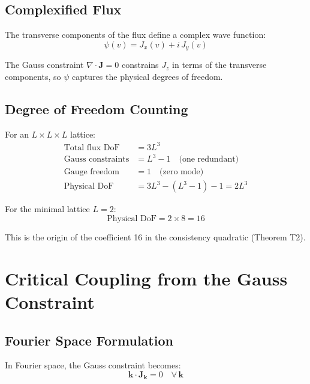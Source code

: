 \documentclass[11pt,a4paper]{article}
\theoremstyle{definition}
\theoremstyle{remark}
\begin{document}
\subsection{Complexified Flux}

The transverse components of the flux define a complex wave function:
\begin{equation}
    \psi(v) = J_x(v) + i\, J_y(v)
\end{equation}

The Gauss constraint $\nabla \cdot \mathbf{J} = 0$ constrains $J_z$ in terms of the transverse components, so $\psi$ captures the physical degrees of freedom.

\subsection{Degree of Freedom Counting}

For an $L \times L \times L$ lattice:
\begin{align}
    \text{Total flux DoF} &= 3L^3 \\
    \text{Gauss constraints} &= L^3 - 1 \quad \text{(one redundant)} \\
    \text{Gauge freedom} &= 1 \quad \text{(zero mode)} \\
    \text{Physical DoF} &= 3L^3 - (L^3 - 1) - 1 = 2L^3
\end{align}

For the minimal lattice $L = 2$:
\begin{equation}
    \boxed{\text{Physical DoF} = 2 \times 8 = 16}
\end{equation}

This is the origin of the coefficient 16 in the consistency quadratic (Theorem T2).

\section{Critical Coupling from the Gauss Constraint}

\subsection{Fourier Space Formulation}

In Fourier space, the Gauss constraint becomes:
\begin{equation}
    \mathbf{k} \cdot \mathbf{J}_\mathbf{k} = 0 \quad \forall\, \mathbf{k}
\end{equation}
\end{document}
